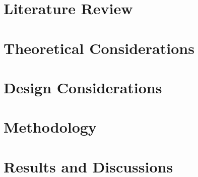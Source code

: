	\chapter{Literature Review} 
	\label{ch:litrev} 
	
	\cleardoublepage
	
	\chapter{Theoretical Considerations}
	\label{ch:theorycon}
	
	\cleardoublepage
	
	\chapter{Design Considerations} 
	\label{ch:designcon} 
	
	\cleardoublepage
	
	\chapter{Methodology} 
	\label{ch:method} 
	
	\cleardoublepage
	
	\ifResultDiscuss 
	\chapter{Results and Discussions} 
		
	\cleardoublepage
	\fi
	
